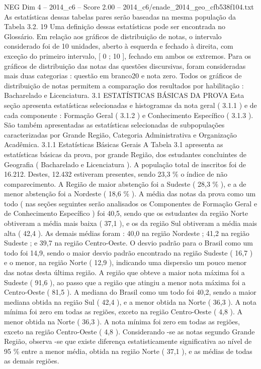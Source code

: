 \begin{textsample}{NEG Dim 4 – 2014\_c6 – Score 2.00 – 2014\_c6/enade\_2014\_geo\_cfb538f104.txt}
As estatísticas dessas tabelas pares serão baseadas na mesma população da Tabela 3.2. 19 Uma definição dessas estatísticas pode ser encontrada no Glossário.
Em relação aos gráficos de distribuição de notas, o intervalo considerado foi de 10 unidades, aberto à esquerda e fechado à direita, com exceção do primeiro intervalo, [ 0 ; 10 ], fechado em ambos os extremos.
Para os gráficos de distribuição das notas das questões discursivas, foram consideradas mais duas categorias : questão em branco20 e nota zero.
Todos os gráficos de distribuição de notas permitem a comparação dos resultados por habilitação : Bacharelado e Licenciatura. 3.1 ESTATÍSTICAS BÁSICAS DA PROVA Esta seção apresenta estatísticas selecionadas e histogramas da nota geral ( 3.1.1 ) e de cada componente : Formação Geral ( 3.1.2 ) e Conhecimento Específico ( 3.1.3 ).
São também apresentadas as estatísticas selecionadas de subpopulações caracterizadas por Grande Região, Categoria Administrativa e Organização Acadêmica. 3.1.1 Estatísticas Básicas Gerais A Tabela 3.1 apresenta as estatísticas básicas da prova, por grande Região, dos estudantes concluintes de Geografia ( Bacharelado e Licenciatura ).
A população total de inscritos foi de 16.212.
Destes, 12.432 estiveram presentes, sendo 23,3 \% o índice de não comparecimento.
A Região de maior abstenção foi a Sudeste ( 28,3 \% ), e a de menor abstenção foi a Nordeste ( 18,6 \% ).
A média das notas da prova como um todo ( nas seções seguintes serão analisados os Componentes de Formação Geral e de Conhecimento Específico ) foi 40,5, sendo que os estudantes da região Norte obtiveram a média mais baixa ( 37,1 ), e os da região Sul obtiveram a média mais alta ( 42,4 ).
As demais médias foram : 40,0 na região Nordeste ; 41,2 na região Sudeste ; e 39,7 na região Centro-Oeste.
O desvio padrão para o Brasil como um todo foi 14,9, sendo o maior desvio padrão encontrado na região Sudeste ( 16,7 ) e o menor, na região Norte ( 12,9 ), indicando uma dispersão um pouco menor das notas desta última região.
A região que obteve a maior nota máxima foi a Sudeste ( 91,6 ), ao passo que a região que atingiu a menor nota máxima foi a Centro-Oeste ( 81,5 ).
A mediana do Brasil como um todo foi 40,2, sendo a maior mediana obtida na região Sul ( 42,4 ), e a menor obtida na Norte ( 36,3 ).
A nota mínima foi zero em todas as regiões, exceto na região Centro-Oeste ( 4,8 ).
A menor obtida na Norte ( 36,3 ).
A nota mínima foi zero em todas as regiões, exceto na região Centro-Oeste ( 4,8 ).
Considerando -se as notas segundo Grande Região, observa -se que existe diferença estatisticamente significativa ao nível de 95 \% entre a menor média, obtida na região Norte ( 37,1 ), e as médias de todas as demais regiões.

\end{textsample}

